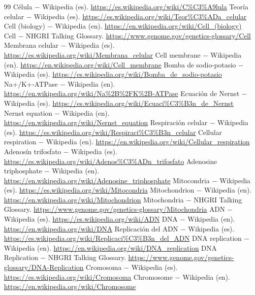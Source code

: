 \documentclass{book}
\begin{document}
\begin{thebibliography}{99}
 Célula \(-\) Wikipedia (es). \url{https://es.wikipedia.org/wiki/C%C3%A9lula}
 Teoría celular \(-\) Wikipedia (es). \url{https://es.wikipedia.org/wiki/Teor%C3%ADa_celular}
 Cell (biology) \(-\) Wikipedia (en). \url{https://en.wikipedia.org/wiki/Cell_(biology)}
 Cell \(-\) NHGRI Talking Glossary. \url{https://www.genome.gov/genetics-glossary/Cell}
 Membrana celular \(-\) Wikipedia (es). \url{https://es.wikipedia.org/wiki/Membrana_celular}
 Cell membrane \(-\) Wikipedia (en). \url{https://en.wikipedia.org/wiki/Cell_membrane}
 Bomba de sodio-potasio \(-\) Wikipedia (es). \url{https://es.wikipedia.org/wiki/Bomba_de_sodio-potasio}
 Na+/K+-ATPase \(-\) Wikipedia (en). \url{https://en.wikipedia.org/wiki/Na%2B%2FK%2B-ATPase}
 Ecuación de Nernst \(-\) Wikipedia (es). \url{https://es.wikipedia.org/wiki/Ecuaci%C3%B3n_de_Nernst}
 Nernst equation \(-\) Wikipedia (en). \url{https://en.wikipedia.org/wiki/Nernst_equation}
 Respiración celular \(-\) Wikipedia (es). \url{https://es.wikipedia.org/wiki/Respiraci%C3%B3n_celular}
 Cellular respiration \(-\) Wikipedia (en). \url{https://en.wikipedia.org/wiki/Cellular_respiration}
 Adenosín trifosfato \(-\) Wikipedia (es). \url{https://es.wikipedia.org/wiki/Adenos%C3%ADn_trifosfato}
 Adenosine triphosphate \(-\) Wikipedia (en). \url{https://en.wikipedia.org/wiki/Adenosine_triphosphate}
 Mitocondria \(-\) Wikipedia (es). \url{https://es.wikipedia.org/wiki/Mitocondria}
 Mitochondrion \(-\) Wikipedia (en). \url{https://en.wikipedia.org/wiki/Mitochondrion}
 Mitochondria \(-\) NHGRI Talking Glossary. \url{https://www.genome.gov/genetics-glossary/Mitochondria}
 ADN \(-\) Wikipedia (es). \url{https://es.wikipedia.org/wiki/ADN}
 DNA \(-\) Wikipedia (en). \url{https://en.wikipedia.org/wiki/DNA}
 Replicación del ADN \(-\) Wikipedia (es). \url{https://es.wikipedia.org/wiki/Replicaci%C3%B3n_del_ADN}
 DNA replication \(-\) Wikipedia (en). \url{https://en.wikipedia.org/wiki/DNA_replication}
 DNA Replication \(-\) NHGRI Talking Glossary. \url{https://www.genome.gov/genetics-glossary/DNA-Replication}
 Cromosoma \(-\) Wikipedia (es). \url{https://es.wikipedia.org/wiki/Cromosoma}
 Chromosome \(-\) Wikipedia (en). \url{https://en.wikipedia.org/wiki/Chromosome}

\end{thebibliography}
\end{document}
